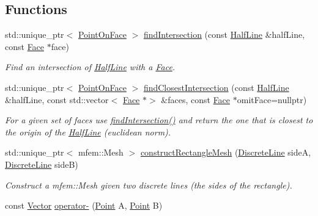 \subsection*{Functions}
\begin{DoxyCompactItemize}
\item 
std\+::unique\+\_\+ptr$<$ \hyperlink{structraytracer_1_1PointOnFace}{Point\+On\+Face} $>$ \hyperlink{namespaceraytracer_ae44c3032cf96db5f4ba9c07f12c9a207}{find\+Intersection} (const \hyperlink{structraytracer_1_1HalfLine}{Half\+Line} \&half\+Line, const \hyperlink{classraytracer_1_1Face}{Face} $\ast$face)
\begin{DoxyCompactList}\small\item\em Find an intersection of \hyperlink{structraytracer_1_1HalfLine}{Half\+Line} with a \hyperlink{classraytracer_1_1Face}{Face}. \end{DoxyCompactList}\item 
std\+::unique\+\_\+ptr$<$ \hyperlink{structraytracer_1_1PointOnFace}{Point\+On\+Face} $>$ \hyperlink{namespaceraytracer_a82c9cab83ec5d18dca4be1b2cbde9dd2}{find\+Closest\+Intersection} (const \hyperlink{structraytracer_1_1HalfLine}{Half\+Line} \&half\+Line, const std\+::vector$<$ \hyperlink{classraytracer_1_1Face}{Face} $\ast$$>$ \&faces, const \hyperlink{classraytracer_1_1Face}{Face} $\ast$omit\+Face=nullptr)
\begin{DoxyCompactList}\small\item\em For a given set of faces use \hyperlink{namespaceraytracer_ae44c3032cf96db5f4ba9c07f12c9a207}{find\+Intersection()} and return the one that is closest to the origin of the \hyperlink{structraytracer_1_1HalfLine}{Half\+Line} (euclidean norm). \end{DoxyCompactList}\item 
std\+::unique\+\_\+ptr$<$ mfem\+::\+Mesh $>$ \hyperlink{group__api_ga289222e1fc63a6e9126da5bbfa7b6a12}{construct\+Rectangle\+Mesh} (\hyperlink{structraytracer_1_1DiscreteLine}{Discrete\+Line} sideA, \hyperlink{structraytracer_1_1DiscreteLine}{Discrete\+Line} sideB)
\begin{DoxyCompactList}\small\item\em Construct a mfem\+::\+Mesh given two discrete lines (the sides of the rectangle). \end{DoxyCompactList}\item 
const \hyperlink{classraytracer_1_1Vector}{Vector} \hyperlink{group__api_ga600238d4569fec2dd95c6fec3f4e8b30}{operator-\/} (\hyperlink{classraytracer_1_1Point}{Point} A, \hyperlink{classraytracer_1_1Point}{Point} B)
$$
\end{DoxyCompactItemize}
